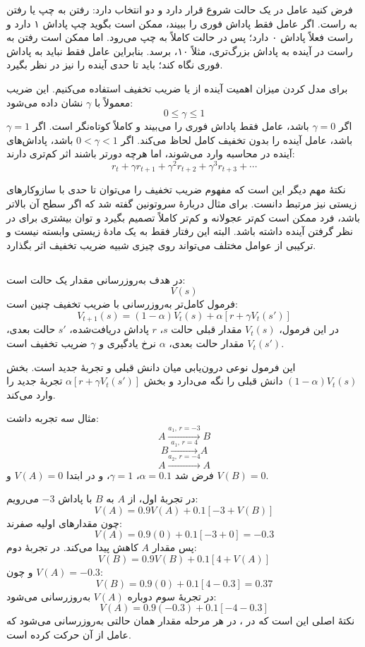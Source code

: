 فرض کنید عامل در یک حالت شروع قرار دارد و دو انتخاب دارد: رفتن به چپ یا رفتن به راست. اگر عامل فقط پاداش فوری را ببیند، ممکن است بگوید چپ پاداش ۱ دارد و راست فعلاً پاداش ۰ دارد؛ پس در حالت کاملاً  به چپ می‌رود. اما ممکن است رفتن به راست در آینده به پاداش بزرگ‌تری، مثلاً ۱۰، برسد. بنابراین عامل فقط نباید به پاداش فوری نگاه کند؛ باید تا حدی آینده را نیز در نظر بگیرد.

برای مدل کردن میزان اهمیت آینده از  یا ضریب تخفیف استفاده می‌کنیم. این ضریب معمولاً با \(\gamma\) نشان داده می‌شود:
\[
0 \leq \gamma \leq 1
\]
اگر \(\gamma = 0\) باشد، عامل فقط پاداش فوری را می‌بیند و کاملاً کوتاه‌نگر است. اگر \(\gamma = 1\) باشد، عامل آینده را بدون تخفیف کامل لحاظ می‌کند. اگر \(0 < \gamma < 1\) باشد، پاداش‌های آینده در محاسبه وارد می‌شوند، اما هرچه دورتر باشند اثر کم‌تری دارند:
\[
r_t + \gamma r_{t+1} + \gamma^2 r_{t+2} + \gamma^3 r_{t+3} + \cdots
\]

نکتهٔ مهم دیگر این است که مفهوم ضریب تخفیف را می‌توان تا حدی با سازوکارهای زیستی نیز مرتبط دانست. برای مثال دربارهٔ سروتونین گفته شد که اگر سطح آن بالاتر باشد، فرد ممکن است کم‌تر عجولانه و کم‌تر کاملاً  تصمیم بگیرد و توان بیشتری برای در نظر گرفتن آینده داشته باشد. البته این رفتار فقط به یک مادهٔ زیستی وابسته نیست و ترکیبی از عوامل مختلف می‌تواند روی چیزی شبیه ضریب تخفیف اثر بگذارد.

\subsection{}
در  هدف به‌روزرسانی مقدار یک حالت است:
\[
V(s)
\]
فرمول کامل‌تر به‌روزرسانی با ضریب تخفیف چنین است:
\[
V_{t+1}(s) = (1-\alpha)V_t(s) + \alpha \left[r + \gamma V_t(s')\right]
\]
در این فرمول، \(V_t(s)\) مقدار قبلی حالت \(s\)، \(r\) پاداش دریافت‌شده، \(s'\) حالت بعدی، \(V_t(s')\) مقدار حالت بعدی، \(\alpha\) نرخ یادگیری و \(\gamma\) ضریب تخفیف است.

این فرمول نوعی درون‌یابی میان دانش قبلی و تجربهٔ جدید است. بخش \((1-\alpha)V_t(s)\) دانش قبلی را نگه می‌دارد و بخش \(\alpha[r+\gamma V_t(s')]\) تجربهٔ جدید را وارد می‌کند.

مثال سه تجربه داشت:
\[
A \xrightarrow{a_1,\, r=-3} B
\]
\[
B \xrightarrow{a_1,\, r=4} A
\]
\[
A \xrightarrow{a_2,\, r=-4} A
\]
فرض شد \(\alpha=0.1\)، \(\gamma=1\)، و در ابتدا \(V(A)=0\) و \(V(B)=0\).

در تجربهٔ اول، از \(A\) به \(B\) با پاداش \(-3\) می‌رویم:
\[
V(A)=0.9V(A)+0.1[-3+V(B)]
\]
چون مقدارهای اولیه صفرند:
\[
V(A)=0.9(0)+0.1[-3+0]=-0.3
\]
پس مقدار \(A\) کاهش پیدا می‌کند. در تجربهٔ دوم:
\[
V(B)=0.9V(B)+0.1[4+V(A)]
\]
و چون \(V(A)=-0.3\):
\[
V(B)=0.9(0)+0.1[4-0.3]=0.37
\]
در تجربهٔ سوم دوباره \(V(A)\) به‌روزرسانی می‌شود:
\[
V(A)=0.9(-0.3)+0.1[-4-0.3]
\]
نکتهٔ اصلی این است که در ، در هر مرحله مقدار همان حالتی به‌روزرسانی می‌شود که عامل از آن حرکت کرده است.

